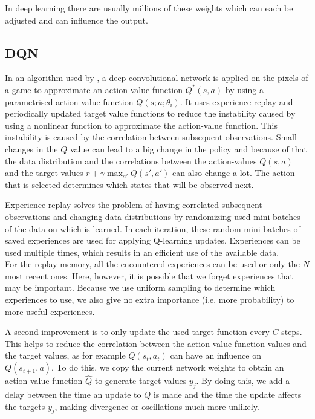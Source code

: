 \documentclass[a4paper]{article}
\begin{document}
In deep learning there are usually millions of these weights which can each be adjusted and can influence the output.
\subsection{DQN}

In an algorithm used by \cite{mnih2013playing}, a deep convolutional network is applied on the pixels of a game to approximate an action-value function $Q^{*}(s,a)$ by using a parametrised action-value function $Q(s;a;\theta_i)$. It uses experience replay and periodically updated target value functions to reduce the instability caused by using a nonlinear function to approximate the action-value function. This instability is caused by the correlation between subsequent observations. Small changes in the $Q$ value can lead to a big change in the policy and because of that the data distribution and the correlations between the action-values $Q(s,a)$ and the target values $r+\gamma \max_{a'} Q(s',a')$ can also change a lot. The action that is selected determines which states that will be observed next.

Experience replay solves the problem of having correlated subsequent observations and changing data distributions by randomizing used mini-batches of the data on which is learned. In each iteration, these random mini-batches of saved experiences are used for applying Q-learning updates. Experiences can be used multiple times, which results in an efficient use of the available data.\\
For the replay memory, all the encountered experiences can be used or only the $N$ most recent ones. Here, however, it is possible that we forget experiences that may be important. Because we use uniform sampling to determine which experiences to use, we also give no extra importance (i.e. more probability) to more useful experiences.

A second improvement is to only update the used target function every $C$ steps. This helps to reduce the correlation between the action-value function values and the target values, as for example $Q(s_t, a_t)$ can have an influence on $Q(s_{t+1},a)$. To do this, we copy the current network weights to obtain an action-value function $\hat{Q}$ to generate target values $y_j$. By doing this, we add a delay between the time an update to $Q$ is made and the time the update affects the targets $y_j$, making divergence or oscillations much more unlikely.
\end{document}
